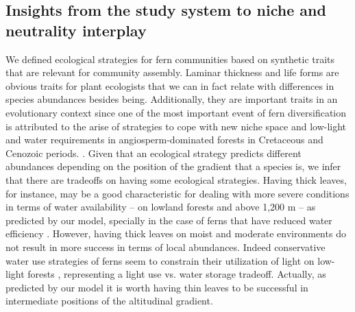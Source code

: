 \documentclass[12pt]{article}
\begin{document}
\subsection*{Insights from the study system to niche and neutrality interplay}

We defined ecological strategies for fern
communities based on synthetic traits that are relevant for community
assembly. 
Laminar thickness and life forms are obvious traits for
plant ecologists that we can in fact relate with differences in species
abundances besides being. %
Additionally,
they are important traits in an evolutionary context since one of the most important event
of fern diversification is attributed to the arise of strategies to cope with
new niche space and low-light and water requirements in angiosperm-dominated forests in Cretaceous and
Cenozoic periods. 
\citep{Schneider2004, Schuettpelz2009}.
Given that an ecological strategy predicts
different abundances depending on the position of the gradient that a
species is, we infer that there are tradeoffs on having some
ecological strategies. Having thick leaves, for instance, may be a
good
characteristic for dealing with more severe conditions in terms of
water availability -- on lowland forests and above 1,200 m -- as
predicted by our model, specially in the case of ferns that have
reduced water efficiency \citep{Page2002,
Watkins2012,Vasco2013}. However, having thick leaves on moist and
moderate environments do not result in more success in terms of local
abundances. 
Indeed conservative water use strategies of ferns seem to
constrain their utilization of light on low-light forests
\citep{Zhang2009}, representing a light use vs. water storage tradeoff.
Actually, as predicted by our model it is worth having thin leaves to
be successful in intermediate positions of the altitudinal
gradient. 
\end{document}
